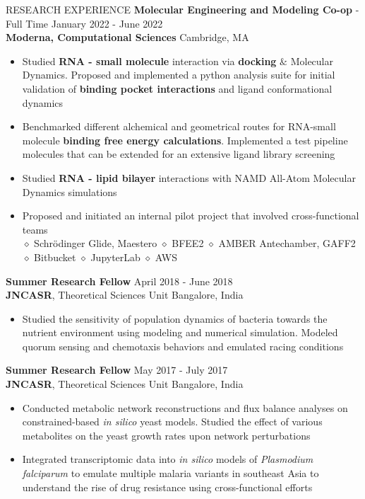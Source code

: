 \documentclass{resume} %
\begin{document}
\begin{rSection}{RESEARCH EXPERIENCE}
   \textbf{Molecular Engineering and Modeling Co-op} - Full Time \hfill January 2022 - June 2022\\
   \textbf{Moderna, Computational Sciences} \hfill {Cambridge, MA}
   \begin{itemize}
      \itemsep -1pt {}
      \item Studied \textbf{RNA - small molecule} interaction via \textbf{docking} $\&$ Molecular Dynamics. Proposed and implemented a python analysis suite for initial validation of \textbf{binding pocket interactions} and ligand conformational dynamics
      \item Benchmarked different alchemical and geometrical routes for RNA-small molecule \textbf{binding free energy calculations}. Implemented a test pipeline molecules that can be extended for an extensive ligand library screening
      \item Studied \textbf{RNA - lipid bilayer} interactions with NAMD All-Atom Molecular Dynamics simulations
      \item  Proposed and initiated an internal pilot project that involved cross-functional teams \\
            $\diamond$ Schr{\"o}dinger Glide, Maestero $\diamond$  BFEE2 $\diamond$ AMBER Antechamber, GAFF2 $\diamond$ Bitbucket $\diamond$ JupyterLab $\diamond$ AWS
   \end{itemize}

   \textbf{Summer Research Fellow} \hfill April 2018 - June 2018\\
   \textbf{JNCASR}, Theoretical Sciences Unit \hfill {Bangalore, India}
   \begin{itemize}
      \itemsep -1pt {}
      \item Studied the sensitivity of population dynamics of bacteria towards the nutrient environment using modeling and numerical simulation. Modeled quorum sensing and chemotaxis behaviors and emulated racing conditions
   \end{itemize}

   \textbf{Summer Research Fellow} \hfill May 2017 - July 2017\\
   \textbf{JNCASR}, Theoretical Sciences Unit \hfill {Bangalore, India}
   \begin{itemize}
      \itemsep -1pt {}
      \item Conducted metabolic network reconstructions and flux balance analyses on constrained-based \textit{in silico} yeast models. Studied the effect of various metabolites on the yeast growth rates upon network perturbations
      \item Integrated transcriptomic data into \textit{in silico} models of \textit{Plasmodium falciparum} to emulate multiple malaria variants in southeast Asia to understand the rise of drug resistance using cross-functional efforts
   \end{itemize}

\end{rSection}
\end{document}
